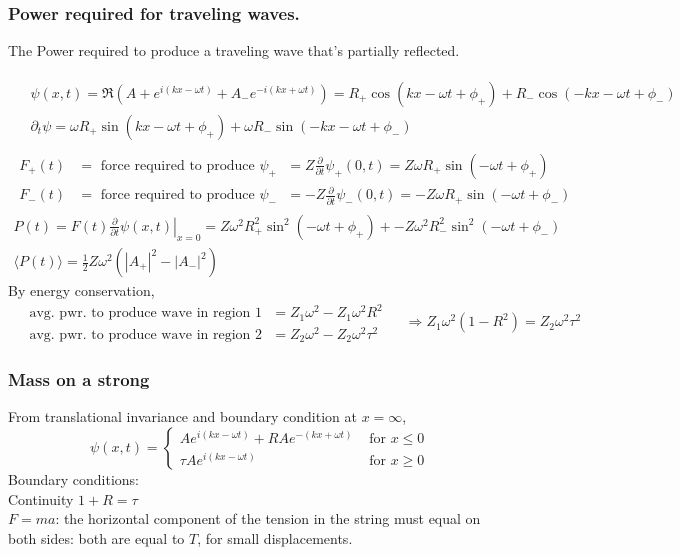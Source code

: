 \documentclass[twoside, 10pt]{amsart}
\begin{document}
\subsubsection{ Power required for traveling waves.}  The Power required to produce a traveling wave that's partially reflected.

\[
\begin{gathered}
  \begin{aligned}
    & \psi(x,t) = \Re{(A+ e^{i(kx -\omega t) } + A_- e^{-i (kx+\omega t)} ) } = R_+ \cos{(kx - \omega t + \phi_+ )} + R_- \cos{ (-kx - \omega t+ \phi_-)}  \\
    &  \partial_t \psi = \omega R_+ \sin{(kx - \omega t + \phi_+)} + \omega R_- \sin{(-k x- \omega t + \phi_- ) } 
  \end{aligned} \\
  \begin{aligned}
    F_+(t) & = \text{ force required to produce $\psi_+$ } = Z \frac{\partial}{\partial t} \psi_+(0,t) = Z \omega R_+ \sin{( -\omega t + \phi_+) } \\
    F_-(t) & = \text{ force required to produce $\psi_-$ } = -Z \frac{\partial}{\partial t} \psi_-(0,t) = - Z \omega R_+ \sin{( -\omega t + \phi_-) } 
  \end{aligned} \\
P(t) = F(t) \left. \frac{ \partial}{ \partial t} \psi(x,t) \right|_{x=0} = Z \omega^2 R_+^2 \sin^2{( -\omega t + \phi_+) } + -Z \omega^2 R_-^2 \sin^2{ (-\omega t + \phi_- ) } \\
\langle P(t) \rangle = \frac{1}{2} Z \omega^2 ( |A_+|^2 - |A_-|^2 )  
\end{gathered}
\]
By energy conservation, 
\[
\begin{aligned}
  & \text{ avg. pwr. to produce wave in region $1$ } = Z_1 \omega^2 - Z_1 \omega^2 R^2 \\
  & \text{ avg. pwr. to produce wave in region $2$ } = Z_2 \omega^2 - Z_2 \omega^2 \tau^2 
\end{aligned} \quad \, \Longrightarrow Z_1 \omega^2 (1-R^2) = Z_2 \omega^2 \tau^2 
\]

\subsubsection{ Mass on a strong }

From translational invariance and boundary condition at $x= \infty$, 
\[
\psi(x,t) = \begin{cases} Ae^{ i (kx - \omega t)} + RA e^{-(kx + \omega t) } & \text{ for } x \leq 0 \\
  \tau A e^{i(kx - \omega t) } & \text{ for } x \geq 0 
\end{cases} 
\]
Boundary conditions: \\
\quad Continuity $1+R = \tau$ \\
\quad $F=ma$: the horizontal component of the tension in the string must equal on both sides: both are equal to $T$, for small displacements.  
\end{document}
